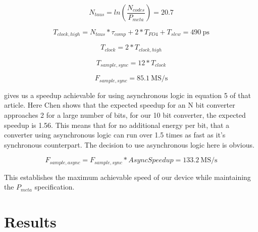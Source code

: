 \documentclass[10pt,journal]{IEEEtran}\usepackage{longtable}
\begin{document}
\begin{equation}
  N_{taus} = ln\left(\frac{N_{codes}}{P_{meta}}\right) = 20.7
\end{equation}

\begin{equation}
  T_{clock,high} = N_{taus} * \tau_{comp} + 2 * T_{FO4} + T_{slew} = \SI{490}{\pico\second}
\end{equation}

\begin{equation}
  T_{clock} = 2 * T_{clock,high}
\end{equation}

\begin{equation}
  T_{sample,sync} = 12 * T_{clock}
\end{equation}

\begin{equation}
  F_{sample,sync} = \SI{85.1}{\mega\siemens\per\second}
\end{equation}

\cite{Chen:2006} gives us a speedup achievable for using asynchronous logic in equation 5 of that article. Here Chen shows that the expected speedup for an N bit converter approaches 2 for a large number of bits, for our 10 bit converter, the expected speedup is 1.56.
This means that for no additional energy per bit, that a converter using asynchronous logic can run over 1.5 times as fast as it's synchronous counterpart. The decision to use asynchronous logic here is obvious.

\begin{equation}
  F_{sample,async} = F_{sample,sync} * AsyncSpeedup = \SI{133.2}{\mega\siemens\per\second}
\end{equation}

This establishes the maximum achievable speed of our device while maintaining the $P_{meta}$ specification.



\section{Results}
\end{document}
